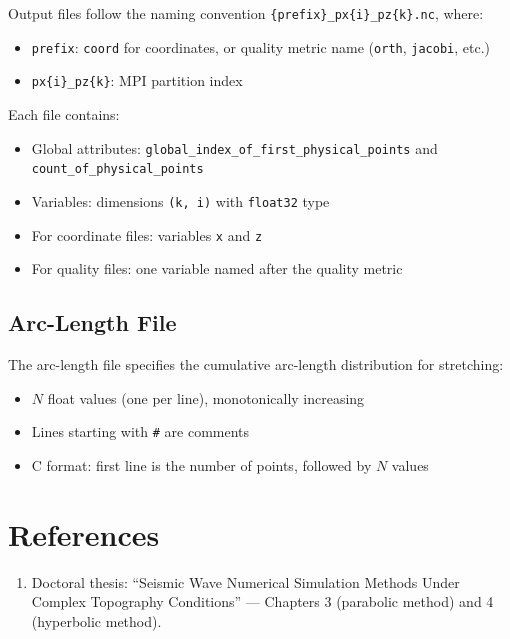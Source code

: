 \documentclass[11pt,a4paper]{report}
\begin{document}
Output files follow the naming convention \texttt{\{prefix\}\_px\{i\}\_pz\{k\}.nc}, where:
\begin{itemize}
    \item \texttt{prefix}: \texttt{coord} for coordinates, or quality metric name (\texttt{orth}, \texttt{jacobi}, etc.)
    \item \texttt{px\{i\}\_pz\{k\}}: MPI partition index
\end{itemize}

Each file contains:
\begin{itemize}
    \item Global attributes: \texttt{global\_index\_of\_first\_physical\_points} and \texttt{count\_of\_physical\_points}
    \item Variables: dimensions \texttt{(k, i)} with \texttt{float32} type
    \item For coordinate files: variables \texttt{x} and \texttt{z}
    \item For quality files: one variable named after the quality metric
\end{itemize}

\section{Arc-Length File}

The arc-length file specifies the cumulative arc-length distribution for stretching:
\begin{itemize}
    \item $N$ float values (one per line), monotonically increasing
    \item Lines starting with \texttt{\#} are comments
    \item C format: first line is the number of points, followed by $N$ values
\end{itemize}

\chapter*{References}

\begin{enumerate}
    \item Doctoral thesis: ``Seismic Wave Numerical Simulation Methods Under Complex Topography Conditions'' --- Chapters 3 (parabolic method) and 4 (hyperbolic method).
\end{enumerate}
\end{document}
